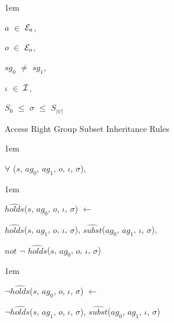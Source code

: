 \documentclass[11pt]{report}
\newenvironment{vquote}
{
  \begin{list}{}{\leftmargin 1em}\item[]
}
{
  \end{list}
}
\begin{document}
\begin{enumerate}
\begin{vquote}
                    \hspace{1em}
                    $a$ $\in$ ${\cal E}_{a}$,

                    \hspace{1em}
                    $o$ $\in$ ${\cal E}_{o}$,

                    \hspace{1em}
                    $sg_0$ $\neq$ $sg_1$,

                    \hspace{1em}
                    $\iota$ $\in$ ${\cal I}$,

                    \hspace{1em}
                    $S_{0}$ $\leq$ $\sigma$ $\leq$ $S_{|\psi|}$
                \end{vquote}

                \item
                  Access Right Group Subset Inheritance Rules

                  \begin{vquote}
                    $\forall$ ($s$, $ag_0$, $ag_1$, $o$, $\iota$, $\sigma$),
                  \end{vquote}

                  \begin{vquote}
                    $\hat{holds}$($s$, $ag_0$, $o$, $\iota$, $\sigma$)
                    $\leftarrow$

                    \hspace{1em}
                    $\hat{holds}$($s$, $ag_1$, $o$, $\iota$, $\sigma$),
                    $\hat{subst}$($ag_0$, $ag_1$, $\iota$, $\sigma$),

                    \hspace{1em}
                    $not$ $\lnot$ $\hat{holds}$($s$, $ag_0$, $o$, $\iota$, $\sigma$)
                  \end{vquote}

                  \begin{vquote}
                    $\lnot\hat{holds}$($s$, $ag_0$, $o$, $\iota$, $\sigma$)
                    $\leftarrow$

                    \hspace{1em}
                    $\lnot\hat{holds}$($s$, $ag_1$, $o$, $\iota$, $\sigma$),
                    $\hat{subst}$($ag_0$, $ag_1$, $\iota$, $\sigma$)
                  \end{vquote}


\end{enumerate}
\end{document}
